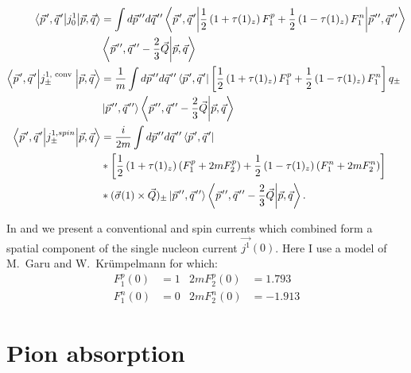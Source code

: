     \begin{align}
            \matrixel**{\pvec{p}, \pvec{q}}{j_0^1}{\vec{p}, \vec{q}} 
            & =\int d \ppvec{p} d \ppvec{q}
            \matrixel**{\pvec{p}, \pvec{q}}{\frac{1}{2}\left(1+\tau(1)_z\right) F_1^p+\frac{1}{2}\left(1-\tau(1)_z\right) F_1^n}{\ppvec{p}, \ppvec{q}}\nonumber\\
            &\braket{\ppvec{p}, \ppvec{q}-\frac{2}{3} \vec{Q}}{\vec{p}, \vec{q}} \\
            \matrixel**{\pvec{p}, \pvec{q}}{j_{ \pm}^{1, \text { conv }}} {\vec{p}, \vec{q}} 
            & =\frac{1}{m} \int d \ppvec{p} d \ppvec{q}
            \bra{\pvec{p}, \pvec{q}}\left[\frac{1}{2}\left(1+\tau(1)_z\right) F_1^p+\frac{1}{2}\left(1-\tau(1)_z\right) F_1^n \right] q_{ \pm}\nonumber\\
            &\ket{\ppvec{p}, \ppvec{q}}
            \braket{\ppvec{p}, \ppvec{q}-\frac{2}{3} \vec{Q}}{\vec{p}, \vec{q}} \label{3n_conv}\\
            \matrixel**{\pvec{p}, \pvec{q}}{j_{ \pm}^{1, spin}}{\vec{p}, \vec{q}} 
            & =\frac{i}{2 m} \int d \ppvec{p} d \ppvec{q}
            \bra{\pvec{p}, \pvec{q}}\nonumber\\
            & *\left[\frac{1}{2}\left(1+\tau(1)_z\right)\left(F_1^p+2 m F_2^p\right)+\frac{1}{2}\left(1-\tau(1)_z\right)\left(F_1^n+2 m F_2^n\right)\right] \nonumber \\
            & *(\vec{\sigma}(1) \times \vec{Q})_{ \pm}\ket{\ppvec{p}, \ppvec{q}}\braket{\ppvec{p}, \ppvec{q}-\frac{2}{3} \vec{Q}}{\vec{p}, \vec{q}} .
            \label{3n_spin}
    \end{align}

    In  and  we present a conventional and spin currents which combined form a spatial component of the 
    single nucleon current $\vec{j^1}(0)$. Here I use a model of M.~Garu and W.~Kr\"umpelmann  \cite{GARI198610} for which:
    \begin{align}
            F_1^p(0)&=1 & 2 m F_2^p(0)&=1.793 \\
            F_1^n(0)&=0 & 2 m F_2^n(0)&=-1.913
    \end{align}


    \section{Pion absorption}

